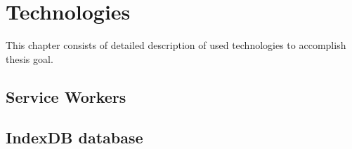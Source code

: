 \chapter{Technologies}
\label{Technologies}

This chapter consists of detailed description of used technologies to accomplish thesis goal.

\section{Service Workers}
\section{IndexDB database}